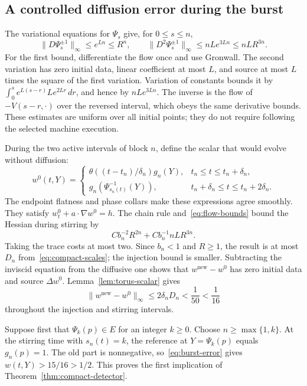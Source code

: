 \subsection{A controlled diffusion error during the burst}\label{sec:compact-error}

The variational equations for $\Psi_s$ give, for $0\le s\le n$,
\begin{equation}\label{eq:flow-bounds}
 \|D\Psi_s^{\pm1}\|_\infty\le e^{Ln}\le R^n,
 \qquad
 \|D^2\Psi_s^{\pm1}\|_\infty
       \le nLe^{3Ln}\le nLR^{3n}.
\end{equation}
For the first bound, differentiate the flow once and use Gronwall.
The second variation has zero initial data, linear coefficient at
most $L$, and source at most $L$ times the square of the first
variation. Variation of constants bounds it by
$\int_0^s e^{L(s-r)}Le^{2Lr}\,dr$, and hence by $nLe^{3Ln}$.
The inverse is the flow of $-V(s-r,\cdot)$ over the reversed interval,
which obeys the same derivative bounds. These estimates are uniform
over all initial points; they do not require following the selected
machine execution.

During the two active intervals of block $n$, define the scalar that
would evolve without diffusion:
\begin{equation}\label{eq:inviscid-reference}
 w^0(t,Y)=
 \begin{cases}
 \theta((t-t_n)/\delta_n)g_n(Y),
                 &t_n\le t\le t_n+\delta_n,\\
 g_n(\Psi_{s_n(t)}^{-1}(Y)),
                 &t_n+\delta_n\le t\le t_n+2\delta_n.
 \end{cases}
\end{equation}
The endpoint flatness and phase collars make these expressions agree
smoothly. They satisfy $w^0_t+a\cdot\nabla w^0=h$.
The chain rule and~\eqref{eq:flow-bounds} bound the Hessian during
stirring by
\[
 Cb_n^{-2}R^{2n}+Cb_n^{-1}nLR^{3n}.
\]
Taking the trace costs at most two. Since $b_n<1$ and $R\ge1$,
the result is at most $D_n$ from~\eqref{eq:compact-scales}; the
injection bound is smaller. Subtracting the inviscid equation from
the diffusive one shows that $w^{\mathrm{new}}-w^0$ has zero initial
data and source $\Delta w^0$. Lemma~\ref{lem:torus-scalar} gives
\begin{equation}\label{eq:burst-error}
 \|w^{\mathrm{new}}-w^0\|_\infty
 \le2\delta_nD_n<\frac1{50}<\frac1{16}
\end{equation}
throughout the injection and stirring intervals.

Suppose first that $\Psi_k(p)\in E$ for an integer $k\ge0$.
Choose $n\ge\max\{1,k\}$. At the stirring time with $s_n(t)=k$,
the reference at $Y=\Psi_k(p)$ equals $g_n(p)=1$. The old part is
nonnegative, so~\eqref{eq:burst-error} gives $w(t,Y)>15/16>1/2$.
This proves the first implication of Theorem~\ref{thm:compact-detector}.

